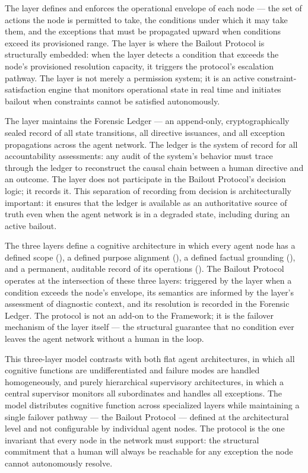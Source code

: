 The \bounds{} layer defines and enforces the operational envelope of each node — the set of actions the node is permitted to take, the conditions under which it may take them, and the exceptions that must be propagated upward when conditions exceed its provisioned range. The \bounds{} layer is where the Bailout Protocol is structurally embedded: when the \bounds{} layer detects a condition that exceeds the node's provisioned resolution capacity, it triggers the protocol's escalation pathway. The \bounds{} layer is not merely a permission system; it is an active constraint-satisfaction engine that monitors operational state in real time and initiates bailout when constraints cannot be satisfied autonomously.

The \fact{} layer maintains the Forensic Ledger — an append-only, cryptographically sealed record of all state transitions, all directive issuances, and all exception propagations across the agent network. The ledger is the system of record for all accountability assessments: any audit of the system's behavior must trace through the ledger to reconstruct the causal chain between a human directive and an outcome. The \fact{} layer does not participate in the Bailout Protocol's decision logic; it records it. This separation of recording from decision is architecturally important: it ensures that the ledger is available as an authoritative source of truth even when the agent network is in a degraded state, including during an active bailout.

The three layers define a cognitive architecture in which every agent node has a defined scope (\bounds{}), a defined purpose alignment (\purpose{}), a defined factual grounding (\truth{}), and a permanent, auditable record of its operations (\fact{}). The Bailout Protocol operates at the intersection of these three layers: triggered by the \bounds{} layer when a condition exceeds the node's envelope, its semantics are informed by the \truth{} layer's assessment of diagnostic context, and its resolution is recorded in the Forensic Ledger. The protocol is not an add-on to the \bxthree{} Framework; it is the failover mechanism of the \bounds{} layer itself — the structural guarantee that no condition ever leaves the agent network without a human in the loop.

This three-layer model contrasts with both flat agent architectures, in which all cognitive functions are undifferentiated and failure modes are handled homogeneously, and purely hierarchical supervisory architectures, in which a central supervisor monitors all subordinates and handles all exceptions. The \bxthree{} model distributes cognitive function across specialized layers while maintaining a single failover pathway — the Bailout Protocol — defined at the architectural level and not configurable by individual agent nodes. The protocol is the one invariant that every node in the network must support: the structural commitment that a human will always be reachable for any exception the node cannot autonomously resolve.